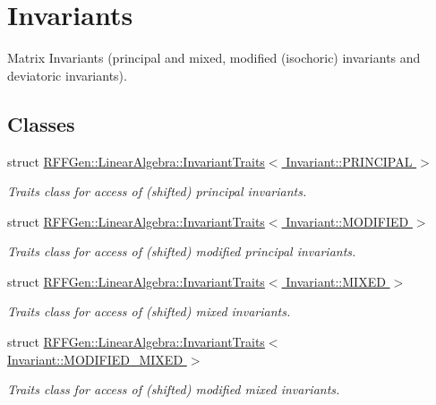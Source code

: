 \hypertarget{group__InvariantGroup}{\section{Invariants}
\label{group__InvariantGroup}
}


Matrix Invariants (principal and mixed, modified (isochoric) invariants and deviatoric invariants).  


\subsection*{Classes}
\begin{DoxyCompactItemize}
\item 
struct \hyperlink{structRFFGen_1_1LinearAlgebra_1_1InvariantTraits_3_01Invariant_1_1PRINCIPAL_01_4}{R\-F\-F\-Gen\-::\-Linear\-Algebra\-::\-Invariant\-Traits$<$ Invariant\-::\-P\-R\-I\-N\-C\-I\-P\-A\-L $>$}
\begin{DoxyCompactList}\small\item\em Traits class for access of (shifted) principal invariants. \end{DoxyCompactList}\item 
struct \hyperlink{structRFFGen_1_1LinearAlgebra_1_1InvariantTraits_3_01Invariant_1_1MODIFIED_01_4}{R\-F\-F\-Gen\-::\-Linear\-Algebra\-::\-Invariant\-Traits$<$ Invariant\-::\-M\-O\-D\-I\-F\-I\-E\-D $>$}
\begin{DoxyCompactList}\small\item\em Traits class for access of (shifted) modified principal invariants. \end{DoxyCompactList}\item 
struct \hyperlink{structRFFGen_1_1LinearAlgebra_1_1InvariantTraits_3_01Invariant_1_1MIXED_01_4}{R\-F\-F\-Gen\-::\-Linear\-Algebra\-::\-Invariant\-Traits$<$ Invariant\-::\-M\-I\-X\-E\-D $>$}
\begin{DoxyCompactList}\small\item\em Traits class for access of (shifted) mixed invariants. \end{DoxyCompactList}\item 
struct \hyperlink{structRFFGen_1_1LinearAlgebra_1_1InvariantTraits_3_01Invariant_1_1MODIFIED__MIXED_01_4}{R\-F\-F\-Gen\-::\-Linear\-Algebra\-::\-Invariant\-Traits$<$ Invariant\-::\-M\-O\-D\-I\-F\-I\-E\-D\-\_\-\-M\-I\-X\-E\-D $>$}
\begin{DoxyCompactList}\small\item\em Traits class for access of (shifted) modified mixed invariants. \end{DoxyCompactList}\item 

\end{DoxyCompactItemize}
